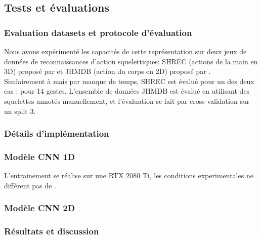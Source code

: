 \subsection{Tests et évaluations}
\subsubsection{Evaluation datasets et protocole d'évaluation}
Nous avons expérimenté les capacités de cette représentation sur deux jeux de données de reconnaissances d'action squelettiques: SHREC (actions de la main en 3D) proposé par \cite{de2017shrec} et JHMDB (action du corps en 2D)  proposé par \cite{jhuang2013towards}.\\

Simlairement à \cite{2019arXiv190709658Y} mais par manque de temps, SHREC est évalué pour un des deux cas : pour 14 gestes. L'ensemble de données JHMDB est évalué en utilisant des squelettes annotés manuellement, et l'évaluation se fait par cross-validation sur un split 3.

\subsubsection{Détails d'implémentation}
\subsubsection{Modèle CNN 1D}
L'entrainement se réalise sur une RTX 2080 Ti, les conditions experimentales ne diffèrent pas de \cite{2019arXiv190709658Y}.

\subsubsection{Modèle CNN 2D}


\subsubsection{Résultats et discussion}


